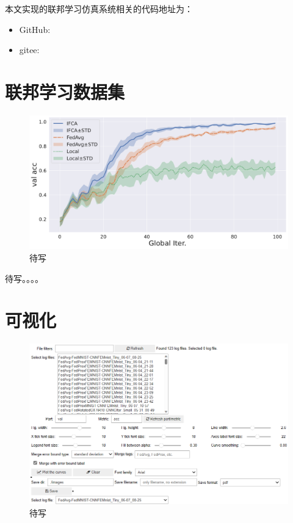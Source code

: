 本文实现的联邦学习仿真系统相关的代码地址为：
\begin{itemize}
    \item GitHub: \urlgithub
    \item gitee: \urlgitee
\end{itemize}

\section{联邦学习数据集}
\label{sec:chap5-datasets}




\begin{figure}[H]
\centering
\includegraphics[width=\textwidth]{figures/fedproxfemnist.pdf}
\caption{待写}
\label{fig:fedproxfemnist-experiment}
\end{figure}

待写。。。。

\section{可视化}
\label{sec:chap5-visualization}


\begin{figure}[H]
    \centering
    \includegraphics[width=\textwidth]{figures/panel-init.png}
    \caption{待写}
    \label{fig:panel-init}
\end{figure}

